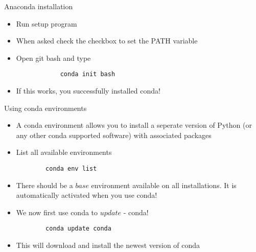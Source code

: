 \begin{frame}[fragile]{Anaconda installation}

		\begin{itemize}
		\item Run setup program
		\item When asked check the checkbox to set the PATH variable
		\item Open git bash and type

		\begin{verbatim}
			conda init bash
		\end{verbatim}
		\item If this works, you successfully installed conda!

		\end{itemize}

\end{frame}

\begin{frame}[fragile]{Using conda environments}

	\begin{itemize}
		\item A conda environment allows you to install a seperate version of Python (or any other conda supported software) with associated packages

		\item List all available environments
		\begin{verbatim}
		conda env list
		\end{verbatim}

		\item There should be a $base$ environment available on all installations. It is automatically activated when you use conda!
		\item We now first use conda to $update$ - conda!
		\begin{verbatim}
		conda update conda
		\end{verbatim}
		\item This will download and install the newest version of conda

	\end{itemize}

\end{frame}

